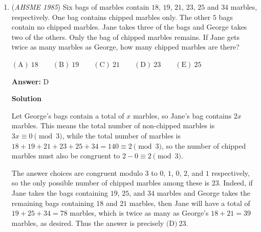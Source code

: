 \begin{enumerate}
$\mathrm{(A)\ } 4.1 \qquad \mathrm{(B) \ }4.2 \qquad \mathrm{(C) \  } 4.3 \qquad \mathrm{(D) \  } 4.4 \qquad \mathrm{(E) \  }4.5$

 \textbf{Answer: }B



\textbf{Solution}

Let $E$ be the point of intersection of $L$ and $\overline{BD}$. Then, because $AE$ is the altitude to the hypotenuse of right triangle $ABD$, triangles $ADE$ and $BAE$ are similar, giving 
 \[\frac{AE}{BE} = \frac{ED}{EA},\] and so 
 \begin{align*}AE &= \sqrt{BE \cdot ED} \\ &= \sqrt{(1+1)(1)} \\ &= \sqrt{2}.\end{align*}
 Thus, taking $BD$ and $AE$ as the base and perpendicular height, respectively, of triangle $ABD$, we may compute its area as $\frac{1}{2}(3)\left(\sqrt{2}\right) = \frac{3\sqrt{2}}{2}$. By symmetry, the area of the entire rectangle $ABCD$ is 
 \[2\left(\frac{3\sqrt{2}}{2}\right) = 3\sqrt{2} \approx (3)(1.4) = \boxed{\text{(B)} \ 4.2}.\]



	\item (\textit{AHSME 1985}) Six bags of marbles contain $18$, $19$, $21$, $23$, $25$ and $34$ marbles, respectively. One bag contains chipped marbles only. The other $5$ bags contain no chipped marbles. Jane takes three of the bags and George takes two of the others. Only the bag of chipped marbles remains. If Jane gets twice as many marbles as George, how many chipped marbles are there?


 $\mathrm{(A)\ } 18 \qquad \mathrm{(B) \ }19 \qquad \mathrm{(C) \  } 21 \qquad \mathrm{(D) \  } 23 \qquad \mathrm{(E) \  }25$

 \textbf{Answer: }D



\textbf{Solution}

Let George's bags contain a total of $x$ marbles, so Jane's bag contains $2x$ marbles. This means the total number of non-chipped marbles is $3x \equiv 0 \pmod{3}$, while the total number of marbles is $18+19+21+23+25+34 = 140 \equiv 2 \pmod{3}$, so the number of chipped marbles must also be congruent to $2-0 \equiv 2 \pmod{3}$.

 The answer choices are congruent modulo 3 to $0$, $1$, $0$, $2$, and $1$ respectively, so the only possible number of chipped marbles among these is $23$. Indeed, if Jane takes the bags containing $19$, $25$, and $34$ marbles and George takes the remaining bags containing $18$ and $21$ marbles, then Jane will have a total of $19+25+34 = 78$ marbles, which is twice as many as George's $18+21 = 39$ marbles, as desired. Thus the answer is precisely $\boxed{\text{(D)} \ 23}$.


\end{enumerate}
